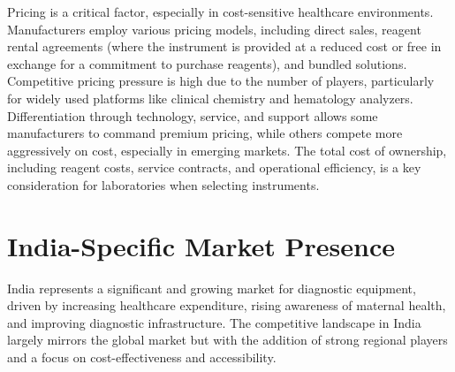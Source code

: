\documentclass{article}
\begin{document}
Pricing is a critical factor, especially in cost-sensitive healthcare environments. Manufacturers employ various pricing models, including direct sales, reagent rental agreements (where the instrument is provided at a reduced cost or free in exchange for a commitment to purchase reagents), and bundled solutions. Competitive pricing pressure is high due to the number of players, particularly for widely used platforms like clinical chemistry and hematology analyzers. Differentiation through technology, service, and support allows some manufacturers to command premium pricing, while others compete more aggressively on cost, especially in emerging markets. The total cost of ownership, including reagent costs, service contracts, and operational efficiency, is a key consideration for laboratories when selecting instruments.

\section{India-Specific Market Presence}
India represents a significant and growing market for diagnostic equipment, driven by increasing healthcare expenditure, rising awareness of maternal health, and improving diagnostic infrastructure. The competitive landscape in India largely mirrors the global market but with the addition of strong regional players and a focus on cost-effectiveness and accessibility.
\end{document}
